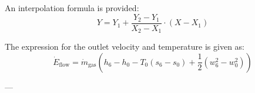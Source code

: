 An interpolation formula is provided:  
\[
Y = Y_1 + \frac{Y_2 - Y_1}{X_2 - X_1} \cdot (X - X_1)
\]

The expression for the outlet velocity and temperature is given as:  
\[
\dot{E}_{\text{flow}} = \dot{m}_{\text{gas}} \left( h_6 - h_0 - T_0 (s_6 - s_0) + \frac{1}{2} (w_6^2 - w_0^2) \right)
\]

---